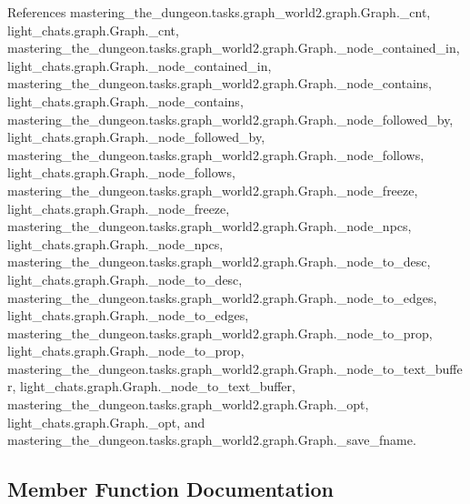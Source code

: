 References mastering\+\_\+the\+\_\+dungeon.\+tasks.\+graph\+\_\+world2.\+graph.\+Graph.\+\_\+cnt, light\+\_\+chats.\+graph.\+Graph.\+\_\+cnt, mastering\+\_\+the\+\_\+dungeon.\+tasks.\+graph\+\_\+world2.\+graph.\+Graph.\+\_\+node\+\_\+contained\+\_\+in, light\+\_\+chats.\+graph.\+Graph.\+\_\+node\+\_\+contained\+\_\+in, mastering\+\_\+the\+\_\+dungeon.\+tasks.\+graph\+\_\+world2.\+graph.\+Graph.\+\_\+node\+\_\+contains, light\+\_\+chats.\+graph.\+Graph.\+\_\+node\+\_\+contains, mastering\+\_\+the\+\_\+dungeon.\+tasks.\+graph\+\_\+world2.\+graph.\+Graph.\+\_\+node\+\_\+followed\+\_\+by, light\+\_\+chats.\+graph.\+Graph.\+\_\+node\+\_\+followed\+\_\+by, mastering\+\_\+the\+\_\+dungeon.\+tasks.\+graph\+\_\+world2.\+graph.\+Graph.\+\_\+node\+\_\+follows, light\+\_\+chats.\+graph.\+Graph.\+\_\+node\+\_\+follows, mastering\+\_\+the\+\_\+dungeon.\+tasks.\+graph\+\_\+world2.\+graph.\+Graph.\+\_\+node\+\_\+freeze, light\+\_\+chats.\+graph.\+Graph.\+\_\+node\+\_\+freeze, mastering\+\_\+the\+\_\+dungeon.\+tasks.\+graph\+\_\+world2.\+graph.\+Graph.\+\_\+node\+\_\+npcs, light\+\_\+chats.\+graph.\+Graph.\+\_\+node\+\_\+npcs, mastering\+\_\+the\+\_\+dungeon.\+tasks.\+graph\+\_\+world2.\+graph.\+Graph.\+\_\+node\+\_\+to\+\_\+desc, light\+\_\+chats.\+graph.\+Graph.\+\_\+node\+\_\+to\+\_\+desc, mastering\+\_\+the\+\_\+dungeon.\+tasks.\+graph\+\_\+world2.\+graph.\+Graph.\+\_\+node\+\_\+to\+\_\+edges, light\+\_\+chats.\+graph.\+Graph.\+\_\+node\+\_\+to\+\_\+edges, mastering\+\_\+the\+\_\+dungeon.\+tasks.\+graph\+\_\+world2.\+graph.\+Graph.\+\_\+node\+\_\+to\+\_\+prop, light\+\_\+chats.\+graph.\+Graph.\+\_\+node\+\_\+to\+\_\+prop, mastering\+\_\+the\+\_\+dungeon.\+tasks.\+graph\+\_\+world2.\+graph.\+Graph.\+\_\+node\+\_\+to\+\_\+text\+\_\+buffer, light\+\_\+chats.\+graph.\+Graph.\+\_\+node\+\_\+to\+\_\+text\+\_\+buffer, mastering\+\_\+the\+\_\+dungeon.\+tasks.\+graph\+\_\+world2.\+graph.\+Graph.\+\_\+opt, light\+\_\+chats.\+graph.\+Graph.\+\_\+opt, and mastering\+\_\+the\+\_\+dungeon.\+tasks.\+graph\+\_\+world2.\+graph.\+Graph.\+\_\+save\+\_\+fname.



\subsection{Member Function Documentation}
\mbox{\label{classmastering__the__dungeon_1_1tasks_1_1graph__world2_1_1graph_1_1Graph_ab2152a1fc6fa0c5240606478953b5622}} 
